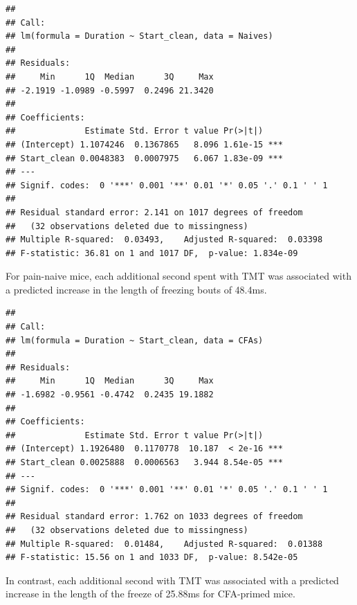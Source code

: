 \documentclass[
]{book}
\newenvironment{Shaded}{\begin{snugshade}}{\end{snugshade}}
\newcommand{\AttributeTok}[1]{\textcolor[rgb]{0.13,0.29,0.53}{#1}}
\newcommand{\FunctionTok}[1]{\textcolor[rgb]{0.13,0.29,0.53}{\textbf{#1}}}
\newcommand{\NormalTok}[1]{#1}
\newcommand{\OtherTok}[1]{\textcolor[rgb]{0.56,0.35,0.01}{#1}}
\newcommand{\SpecialCharTok}[1]{\textcolor[rgb]{0.81,0.36,0.00}{\textbf{#1}}}
\newcommand{\StringTok}[1]{\textcolor[rgb]{0.31,0.60,0.02}{#1}}
\begin{document}
\begin{verbatim}
## 
## Call:
## lm(formula = Duration ~ Start_clean, data = Naives)
## 
## Residuals:
##     Min      1Q  Median      3Q     Max 
## -2.1919 -1.0989 -0.5997  0.2496 21.3420 
## 
## Coefficients:
##              Estimate Std. Error t value Pr(>|t|)    
## (Intercept) 1.1074246  0.1367865   8.096 1.61e-15 ***
## Start_clean 0.0048383  0.0007975   6.067 1.83e-09 ***
## ---
## Signif. codes:  0 '***' 0.001 '**' 0.01 '*' 0.05 '.' 0.1 ' ' 1
## 
## Residual standard error: 2.141 on 1017 degrees of freedom
##   (32 observations deleted due to missingness)
## Multiple R-squared:  0.03493,    Adjusted R-squared:  0.03398 
## F-statistic: 36.81 on 1 and 1017 DF,  p-value: 1.834e-09
\end{verbatim}

For pain-naive mice, each additional second spent with TMT was associated with a predicted increase in the length of freezing bouts of 48.4ms.

\begin{Shaded}
\end{Shaded}

\begin{verbatim}
## 
## Call:
## lm(formula = Duration ~ Start_clean, data = CFAs)
## 
## Residuals:
##     Min      1Q  Median      3Q     Max 
## -1.6982 -0.9561 -0.4742  0.2435 19.1882 
## 
## Coefficients:
##              Estimate Std. Error t value Pr(>|t|)    
## (Intercept) 1.1926480  0.1170778  10.187  < 2e-16 ***
## Start_clean 0.0025888  0.0006563   3.944 8.54e-05 ***
## ---
## Signif. codes:  0 '***' 0.001 '**' 0.01 '*' 0.05 '.' 0.1 ' ' 1
## 
## Residual standard error: 1.762 on 1033 degrees of freedom
##   (32 observations deleted due to missingness)
## Multiple R-squared:  0.01484,    Adjusted R-squared:  0.01388 
## F-statistic: 15.56 on 1 and 1033 DF,  p-value: 8.542e-05
\end{verbatim}

In contrast, each additional second with TMT was associated with a predicted increase in the length of the freeze of 25.88ms for CFA-primed mice.
\end{document}
